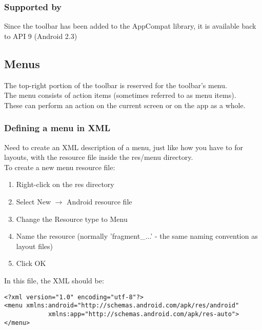 \documentclass[]{article}
\begin{document}
\subsubsection{Supported by}
Since the toolbar has been added to the AppCompat library, it is available back to API 9 (Android 2.3)

\subsection{Menus}
The top-right portion of the toolbar is reserved for the toolbar's menu.
\\
The menu consists of action items (sometimes referred to as menu items).
\\
These can perform an action on the current screen or on the app as a whole.

\subsubsection{Defining a menu in XML}
Need to create an XML description of a menu, just like how you have to for layouts, with the resource file inside the res/menu directory.
\\
To create a new menu resource file:
\begin{enumerate}
	\item Right-click on the res directory
	\item Select New $\rightarrow$ Android resource file
	\item Change the Resource type to Menu 
	\item Name the resource (normally 'fragment\_...' - the same naming convention as layout files)
	\item Click OK
\end{enumerate}
In this file, the XML should be:
\begin{lstlisting}
<?xml version="1.0" encoding="utf-8"?>
<menu xmlns:android="http://schemas.android.com/apk/res/android"
			xmlns:app="http://schemas.android.com/apk/res-auto">
</menu>
\end{lstlisting}
\end{document}
